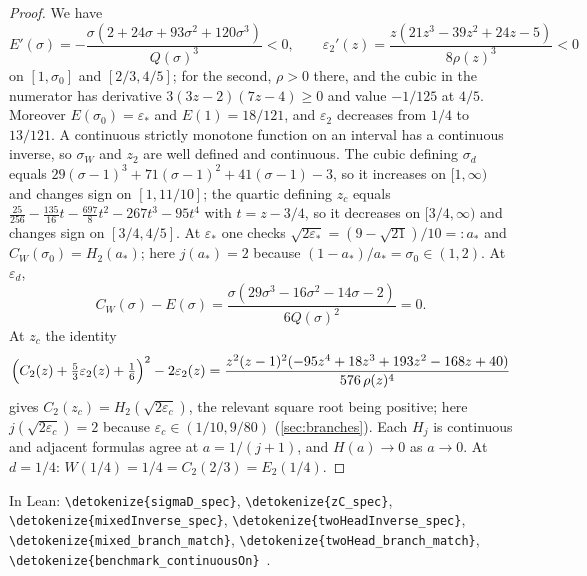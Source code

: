 \documentclass[10pt]{article}
\theoremstyle{definition}
\theoremstyle{remark}
\numberwithin{equation}{section}
\newcommand{\eps}{\varepsilon}
\newcommand{\leanid}[1]{\expandafter\nolinkurl\expandafter{\detokenize{#1}}}
\newcommand{\Fm}[1]{\cite[#1]{Formalization}}
\begin{document}
\begin{proof}
We have
\[
 E'(\sigma)=-\frac{\sigma(2+24\sigma+93\sigma^2+120\sigma^3)}{Q(\sigma)^3}<0,\qquad
 \eps_2'(z)=\frac{z(21z^3-39z^2+24z-5)}{8\rho(z)^3}<0
\]
on $[1,\sigma_0]$ and $[2/3,4/5]$; for the second, $\rho>0$ there, and the cubic in the numerator has derivative $3(3z-2)(7z-4)\ge0$ and value $-1/125$ at $4/5$. Moreover $E(\sigma_0)=\eps_*$ and $E(1)=18/121$, and $\eps_2$ decreases from $1/4$ to $13/121$. A continuous strictly monotone function on an interval has a continuous inverse, so $\sigma_W$ and $z_2$ are well defined and continuous. The cubic defining $\sigma_d$ equals $29(\sigma-1)^3+71(\sigma-1)^2+41(\sigma-1)-3$, so it increases on $[1,\infty)$ and changes sign on $[1,11/10]$; the quartic defining $z_c$ equals $\frac{25}{256}-\frac{135}{16}t-\frac{697}{8}t^2-267t^3-95t^4$ with $t=z-3/4$, so it decreases on $[3/4,\infty)$ and changes sign on $[3/4,4/5]$. At $\eps_*$ one checks $\sqrt{2\eps_*}=(9-\sqrt{21})/10=:a_*$ and $C_W(\sigma_0)=H_2(a_*)$; here $j(a_*)=2$ because $(1-a_*)/a_*=\sigma_0\in(1,2)$. At $\eps_d$,
\[
 C_W(\sigma)-E(\sigma)=\frac{\sigma(29\sigma^3-16\sigma^2-14\sigma-2)}{6Q(\sigma)^2}=0.
\]
At $z_c$ the identity
\[
 \Bigl(C_2(z)+\tfrac53\eps_2(z)+\tfrac16\Bigr)^2-2\eps_2(z)=\frac{z^2(z-1)^2(-95z^4+18z^3+193z^2-168z+40)}{576\,\rho(z)^4}
\]
gives $C_2(z_c)=H_2(\sqrt{2\eps_c})$, the relevant square root being positive; here $j(\sqrt{2\eps_c})=2$ because $\eps_c\in(1/10,9/80)$ (\cref{sec:branches}). Each $H_j$ is continuous and adjacent formulas agree at $a=1/(j+1)$, and $H(a)\to0$ as $a\to0$. At $d=1/4$: $W(1/4)=1/4=C_2(2/3)=E_2(1/4)$.
\end{proof}

In Lean: \leanid{sigmaD_spec}, \leanid{zC_spec}, \leanid{mixedInverse_spec}, \leanid{twoHeadInverse_spec}, \leanid{mixed_branch_match}, \leanid{twoHead_branch_match}, \leanid{benchmark_continuousOn}~\Fm{\S2}.
\end{document}
